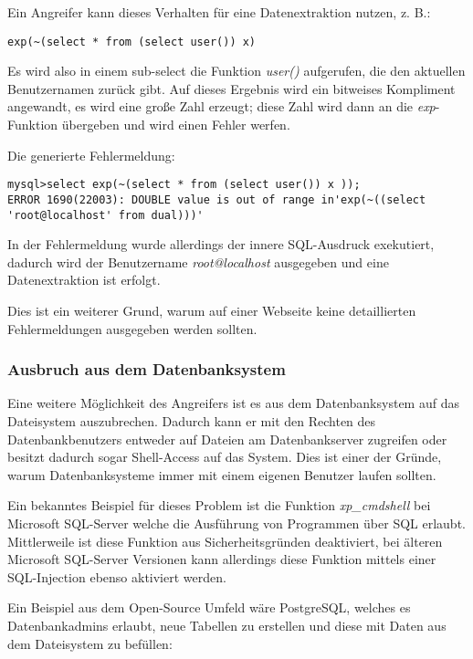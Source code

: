 Ein Angreifer kann dieses Verhalten für eine Datenextraktion nutzen, z. B.:

\begin{verbatim}
exp(~(select * from (select user()) x)
\end{verbatim}

Es wird also in einem sub-select die Funktion \textit{user()} aufgerufen, die den aktuellen Benutzernamen zurück gibt. Auf dieses Ergebnis wird ein bitweises Kompliment angewandt, es wird eine große Zahl erzeugt; diese Zahl wird dann an die \textit{exp}-Funktion übergeben und wird einen Fehler werfen.

Die generierte Fehlermeldung:

\begin{verbatim}
mysql>select exp(~(select * from (select user()) x ));
ERROR 1690(22003): DOUBLE value is out of range in'exp(~((select 'root@localhost' from dual)))'
\end{verbatim}

In der Fehlermeldung wurde allerdings der innere SQL-Ausdruck exekutiert, dadurch wird der Benutzername \textit{root@localhost} ausgegeben und eine Datenextraktion ist erfolgt.

Dies ist ein weiterer Grund, warum auf einer Webseite keine detaillierten Fehlermeldungen ausgegeben werden sollten.

\subsubsection{Ausbruch aus dem Datenbanksystem}

Eine weitere Möglichkeit des Angreifers ist es aus dem Datenbanksystem auf das Dateisystem auszubrechen. Dadurch kann er mit den Rechten des Datenbankbenutzers entweder auf Dateien am Datenbankserver zugreifen oder besitzt dadurch sogar Shell-Access auf das System. Dies ist einer der Gründe, warum Datenbanksysteme immer mit einem eigenen Benutzer laufen sollten.

Ein bekanntes Beispiel für dieses Problem ist die Funktion \textit{xp\_cmdshell} bei Microsoft SQL-Server welche die Ausführung von Programmen über SQL erlaubt. Mittlerweile ist diese Funktion aus Sicherheitsgründen deaktiviert, bei älteren Microsoft SQL-Server Versionen kann allerdings diese Funktion mittels einer SQL-Injection ebenso aktiviert werden.

Ein Beispiel aus dem Open-Source Umfeld wäre PostgreSQL, welches es Datenbankadmins erlaubt, neue Tabellen zu erstellen und diese mit Daten aus dem Dateisystem zu befüllen:


